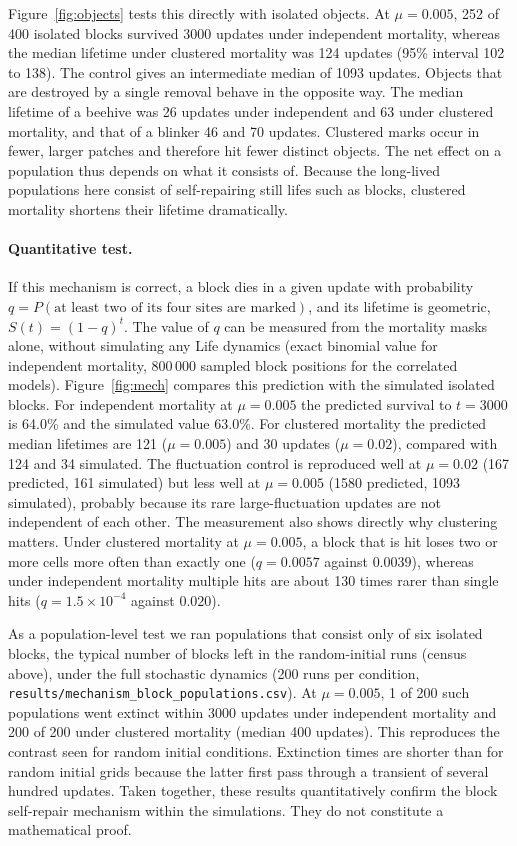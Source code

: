 \documentclass[11pt,a4paper]{article}
\begin{document}
Figure~\ref{fig:objects} tests this directly with isolated objects. At $\mu=0.005$, 252 of 400 isolated blocks survived 3000 updates under independent mortality, whereas the median lifetime under clustered mortality was 124 updates (95\% interval 102 to 138). The control gives an intermediate median of 1093 updates. Objects that are destroyed by a single removal behave in the opposite way. The median lifetime of a beehive was 26 updates under independent and 63 under clustered mortality, and that of a blinker 46 and 70 updates. Clustered marks occur in fewer, larger patches and therefore hit fewer distinct objects. The net effect on a population thus depends on what it consists of. Because the long-lived populations here consist of self-repairing still lifes such as blocks, clustered mortality shortens their lifetime dramatically. \paragraph{Quantitative test.} If this mechanism is correct, a block dies in a given update with probability $q=P(\text{at least two of its four sites are marked})$, and its lifetime is geometric, $S(t)=(1-q)^t$. The value of $q$ can be measured from the mortality masks alone, without simulating any Life dynamics (exact binomial value for independent mortality, 800\,000 sampled block positions for the correlated models). Figure~\ref{fig:mech} compares this prediction with the simulated isolated blocks. For independent mortality at $\mu=0.005$ the predicted survival to $t=3000$ is 64.0\% and the simulated value 63.0\%. For clustered mortality the predicted median lifetimes are 121 ($\mu=0.005$) and 30 updates ($\mu=0.02$), compared with 124 and 34 simulated. The fluctuation control is reproduced well at $\mu=0.02$ (167 predicted, 161 simulated) but less well at $\mu=0.005$ (1580 predicted, 1093 simulated), probably because its rare large-fluctuation updates are not independent of each other. The measurement also shows directly why clustering matters. Under clustered mortality at $\mu=0.005$, a block that is hit loses two or more cells more often than exactly one ($q=0.0057$ against $0.0039$), whereas under independent mortality multiple hits are about 130 times rarer than single hits ($q=1.5\times10^{-4}$ against $0.020$).

As a population-level test we ran populations that consist only of six isolated blocks, the typical number of blocks left in the random-initial runs (census above), under the full stochastic dynamics (200 runs per condition, \texttt{results/mechanism\_block\_populations.csv}). At $\mu=0.005$, 1 of 200 such populations went extinct within 3000 updates under independent mortality and 200 of 200 under clustered mortality (median 400 updates). This reproduces the contrast seen for random initial conditions. Extinction times are shorter than for random initial grids because the latter first pass through a transient of several hundred updates. Taken together, these results quantitatively confirm the block self-repair mechanism within the simulations. They do not constitute a mathematical proof.
\end{document}
